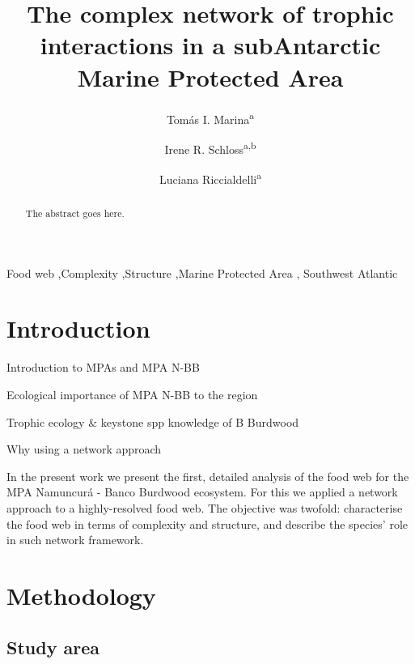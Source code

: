 \documentclass[preprint, 3p,
authoryear]{elsarticle} %
\begin{document}
\begin{frontmatter}

  \title{The complex network of trophic interactions in a subAntarctic
Marine Protected Area}
    \author[]{Tomás I. Marina\textsuperscript{a}%
  }
    \author[]{Irene R. Schloss\textsuperscript{a,b}%
  }
  
    \author[]{Luciana Riccialdelli\textsuperscript{a}%
  }
  
  
  \begin{abstract}
  The abstract goes here.
  \end{abstract}
    \begin{keyword}
    Food web \sep Complexity \sep Structure \sep Marine Protected
Area \sep 
    Southwest Atlantic
  \end{keyword}
  
 \end{frontmatter}

\hypertarget{introduction}{%
\section{Introduction}\label{introduction}}

Introduction to MPAs and MPA N-BB

Ecological importance of MPA N-BB to the region

Trophic ecology \& keystone spp knowledge of B Burdwood

Why using a network approach

In the present work we present the first, detailed analysis of the food
web for the MPA Namuncurá - Banco Burdwood ecosystem. For this we
applied a network approach to a highly-resolved food web. The objective
was twofold: characterise the food web in terms of complexity and
structure, and describe the species' role in such network framework.

\hypertarget{methodology}{%
\section{Methodology}\label{methodology}}

\hypertarget{study-area}{%
\subsection{Study area}\label{study-area}}
\end{document}

